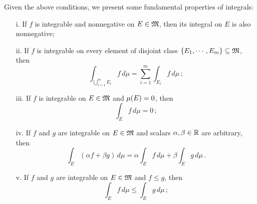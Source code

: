 Given the above conditions, we present some fundamental properties of integrals:

\begin{itemize}
	\setlength\itemsep{.1em}
	\item[i.] If $f$ is integrable and nonnegative on $E\in\mathfrak{M}$, then its integral on $E$ is also nonnegative;
	\item[ii.] If $f$ is integrable on every element of disjoint class $\{E_1,\cdots,E_m\}\subseteq \mathfrak{M}$, then
	\begin{equation}
	\int_{\bigcup_{i=1}^mE_i}f\,d\mu=\sum_{{i}=1}^{m} \int_{E_i}f\,d\mu\,;
	\end{equation}
	\item[iii.] If $f$ is integrable on $E\in\mathfrak{M}$ and $\mu(E)=0$, then
	\begin{equation}
	\int_{E}f\,d\mu =0\,;
	\end{equation}
	 \item[iv.] If $f$ and $g$ are integrable on $E\in\mathfrak{M}$ and scalars $\alpha,\beta\in\mathbb{R}$ are arbitrary, then
	 \begin{equation}
	 \int_{E}(\alpha f +\beta g)\,d\mu = \alpha\int_{E}f\,d\mu+\beta\int_{E}g\,d\mu \,.
	 \end{equation}
	\item[v.] If $f$ and $g$ are integrable on $E\in\mathfrak{M}$ and $f\leqslant g$, then 
	\begin{equation}
	\int_{E} f\, d\mu \leqslant \int_{E} g\, d\mu\,; 
	\end{equation}	  
\end{itemize}


